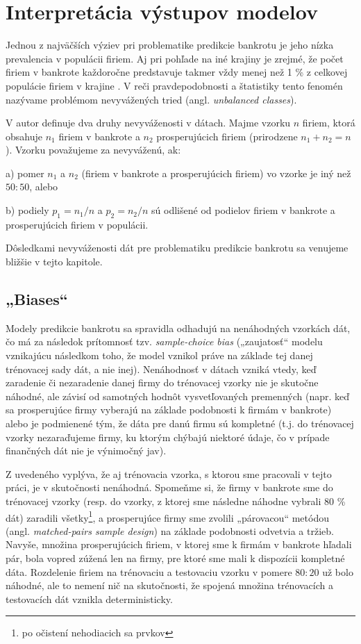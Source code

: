 \section{Interpretácia výstupov modelov}

Jednou z najväčších výziev pri problematike predikcie bankrotu je jeho nízka prevalencia v populácii firiem.
Aj pri pohľade na iné krajiny je zrejmé, že počet firiem v bankrote každoročne predstavuje takmer vždy menej než 1 \% z celkovej populácie
firiem v krajine \cite{gruszczynski}. %
V reči pravdepodobnosti a štatistiky tento fenomén nazývame problémom nevyvážených tried (angl. \emph{unbalanced classes}).

V \cite{gruszczynski} autor definuje dva druhy nevyváženosti v dátach.
Majme vzorku \(n\) firiem, ktorá obsahuje \(n_1\) firiem v bankrote a \(n_2\) prosperujúcich firiem (prirodzene \(n_1 + n_2 = n\)).
Vzorku považujeme za nevyváženú, ak:

\bigskip
a) pomer \(n_1\) a \(n_2\) (firiem v bankrote a prosperujúcich firiem) vo vzorke je iný než \(50:50\), alebo

b) podiely \(p_1 = n_1/n\) a \(p_2 = n_2/n\) sú odlišené od podielov firiem v bankrote a prosperujúcich firiem v populácii.
\bigskip

Dôsledkami nevyváženosti dát pre problematiku predikcie bankrotu sa venujeme bližšie v tejto kapitole.

\subsection{„Biases“}

Modely predikcie bankrotu sa spravidla odhadujú na nenáhodných vzorkách dát, čo má za následok  prítomnosť tzv. \emph{sample-choice bias}
(„zaujatosť“ modelu vznikajúcu následkom toho, že model vznikol práve na základe tej danej trénovacej sady dát, a nie inej).
Nenáhodnosť v dátach vzniká vtedy, keď zaradenie či nezaradenie danej firmy do trénovacej vzorky nie je skutočne náhodné, ale závisí od samotných hodnôt vysvetľovaných premenných
(napr. keď sa prosperujúce firmy vyberajú na základe podobnosti k firmám v bankrote) alebo je podmienené tým, že dáta pre danú firmu sú kompletné
(t.j. do trénovacej vzorky nezaraďujeme firmy, ku ktorým chýbajú niektoré údaje, čo v prípade finančných dát nie je výnimočný jav).

Z uvedeného vyplýva, že aj trénovacia vzorka, s ktorou sme pracovali v tejto práci, je v skutočnosti nenáhodná.
Spomeňme si, že firmy v bankrote sme do trénovacej vzorky (resp. do vzorky, z ktorej sme následne náhodne vybrali 80 \% dát) zaradili všetky\footnote{po očistení nehodiacich sa prvkov},
a prosperujúce firmy sme zvolili „párovacou“ metódou (angl. \emph{matched-pairs sample design}) na základe podobnosti odvetvia a tržieb.
Navyše, množina prosperujúcich firiem, v ktorej sme k firmám v bankrote hľadali pár, bola vopred zúžená len na firmy, pre ktoré sme mali k dispozícii kompletné dáta.
Rozdelenie firiem na trénovaciu a testovaciu vzorku v pomere \(80:20\) už bolo náhodné, ale to nemení nič na skutočnosti, že spojená množina trénovacích a testovacích dát vznikla deterministicky.

